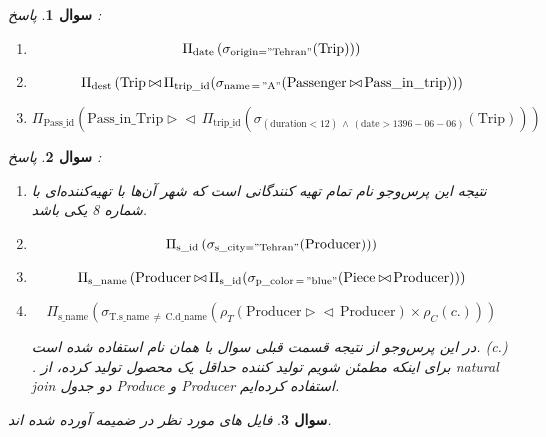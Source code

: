 \documentclass[12pt]{article}
\newtheorem{question}{سوال}
\newcommand{\prd}{\triangleright\!\!\triangleleft\,}
\begin{document}
\begin{question}
	پاسخ :
\begin{latin}
\begin{enumerate}[label=\alph*)]
\item

	$$
	\Pi_{\mathrm{date}}\left(\sigma_{\text{origin}=\mathrm{"Tehran"}}(\mathrm{Trip}))\right)
	$$
	
	
\item 
	\[
	\Pi_{\mathrm{dest}} \left(
	\mathrm{Trip} \prd \Pi_\mathrm{trip\_id}(\sigma_\mathrm{name\,=\,"A"}
	(
	\mathrm{Passenger}\prd \mathrm{Pass\_in\_trip}
	))
	\right)
	\]
	
	
\item 
	\[
	\Pi_{\mathrm{Pass\_id}} \left(
	\mathrm{Pass\_in\_Trip} \prd \Pi_\mathrm{trip\_id}(\sigma_\mathrm{(duration < 12)\,\wedge\,(date > 1396-06-06)}
	(
	\mathrm{Trip}
	))
	\right)
	\]
	

\end{enumerate}
\end{latin}
\end{question}

\begin{question}
	پاسخ :
\begin{enumerate}
	\item[.a]
	نتیجه این پرس‌و‌جو نام تمام تهیه کنندگانی است که شهر آن‌ها با تهیه‌کننده‌ای با شماره 8 یکی باشد.
		
	\item[.b]
	
	$$
	\Pi_{\mathrm{s\_id}}\left(\sigma_{\text{s\_city}=\mathrm{"Tehran"}}(\mathrm{Producer}))\right)
	$$
	
	
	\item[.c]
	\[
	\Pi_{\mathrm{s\_name}} \left(
	\mathrm{Producer} \prd \Pi_\mathrm{s\_id}(\sigma_\mathrm{p\_color\,=\,"blue"}
	(
	\mathrm{Piece}\prd \mathrm{Producer}
	))
	\right)
	\]
	
	
	\item[.d]
	\[
	\Pi_{\mathrm{s\_name}} \left(
	\sigma_\mathrm{T.s\_name\,\ne\,C.d\_name}(\rho_T( \mathrm{Producer}
	\prd \mathrm{Producer}
	)
	\times \rho_C(c.)
	)
	\right)
	\]
	
	در این پرس‌و‌جو از نتیجه قسمت قبلی سوال با همان نام استفاده شده است.
	 (c.)
	.  برای اینکه مطمئن شویم تولید کننده حداقل یک محصول تولید کرده، از natural join دو جدول Produce و Producer استفاده کرده‌ایم.
	
\end{enumerate}
\end{question}
\begin{question}
	فایل های مورد نظر در ضمیمه آورده شده اند.
\end{question}
\end{document}
